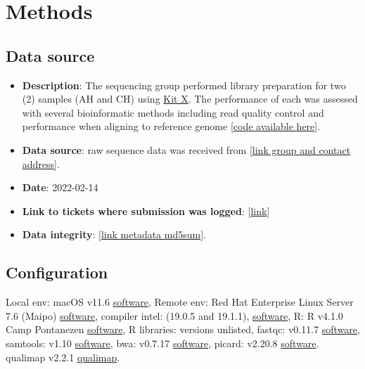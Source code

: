 \documentclass{article}
\begin{document}
\section{Methods}
\subsection{Data source}
 \label{data_source}

\begin{itemize}
\item \textbf{Description}: The sequencing group performed library preparation for two (2) samples (AH and CH) using \href{https://www.sophiagenetics.com/clinical/oncology/solid-tumors/}{Kit X}.
The performance of each was assessed with several bioinformatic methods including read quality control and performance when aligning to reference genome
[\href{https://github.com/DylanLawless/kit_assess}{code available here}].
\item \textbf{Data source}: raw sequence data was received from
 [\href{https://www.sophiagenetics.com}{link group and contact address}].
\item \textbf{Date}: 2022-02-14
\item \textbf{Link to tickets where submission was logged}: [\href{https://www.sophiagenetics.com}{link}]
\item \textbf{Data integrity}: [\href{https://github.com/DylanLawless/kit_assess/src/raw.md5sum}{link metadata md5sum}].
\end{itemize}

\subsection{Configuration}

Local env: macOS v11.6 \href{https://support.apple.com/macos}{software},
Remote env: Red Hat Enterprise Linux Server 7.6 (Maipo)  \href{https://www.redhat.com/en/technologies/linux-platforms/enterprise-linux}{software},
compiler intel: (19.0.5 and 19.1.1),
\href{https://www.intel.com/content/www/us/en/developer/tools/oneapi/commercial-base-hpc.html#gs.ppyt3x}{software},
R: R v4.1.0 Camp Pontanezen  \href{https://www.r-project.org}{software},
R libraries: versions unlisted,
fastqc: v0.11.7 \href{https://www.bioinformatics.babraham.ac.uk/projects/fastqc/}{software},
samtools: v1.10 \href{https://www.htslib.org}{software},
bwa: v0.7.17 \href{https://janis.readthedocs.io/en/latest/tools/bioinformatics/bwa/bwamem.html}{software},
picard: v2.20.8  \href{http://broadinstitute.github.io/picard/}{software}.
qualimap v2.2.1 \href{http://qualimap.conesalab.org}{qualimap}.
\end{document}
